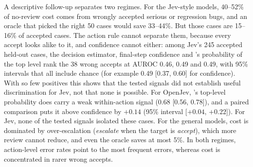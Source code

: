 \begin{colfigure}
\centering
{}
\caption{Total cost at a 10\% review budget under the pre-registered
cost table. No feasible strategy beats
no review. A perfect reviewer (oracle, an upper bound using held-out
outcomes) would cut Jev's cost by 44\% and OpenJev's by 33\%. For the general
models it saves little or nothing: they escalate most cases themselves,
leaving few reviewable errors (Phi-3.5's oracle exceeds no review because
50 reviews must be spent on 63 candidates, only 4 of which gain).}
\label{fig:intervention}
\end{colfigure}

 A descriptive follow-up separates two regimes.
For the Jev-style models, 40--52\% of no-review cost comes from wrongly
accepted serious or regression bugs, and an oracle that picked
the right 50 cases would save 33--44\%. But those cases are 15--16\% of
accepted cases. The action rule cannot separate them, because every
accept looks alike to it, and confidence cannot either: among Jev's 245
accepted held-out cases, the decision estimator, final-step confidence
and \score{}'s probability of the top level rank the 38 wrong accepts at
AUROC 0.46, 0.49 and 0.49, with 95\% intervals that all include chance
(for example 0.49 [0.37, 0.60] for confidence). With so few positives
this shows that the tested signals did not establish useful
discrimination for Jev, not that none is possible. For OpenJev,
\score{}'s top-level probability does carry a weak within-action signal
(0.68 [0.56, 0.78]), and a paired comparison puts it above confidence by
$+0.14$ (95\% interval [$+0.04$, $+0.22$]). For Jev, none of the tested
signals isolated these cases. For the general models, cost is dominated by
over-escalation (\emph{escalate} when the target is \emph{accept}), which
more review cannot reduce, and even the oracle saves at most 5\%. In both
regimes, action-level error rates point to the most frequent errors,
whereas cost is concentrated in rarer wrong accepts.

